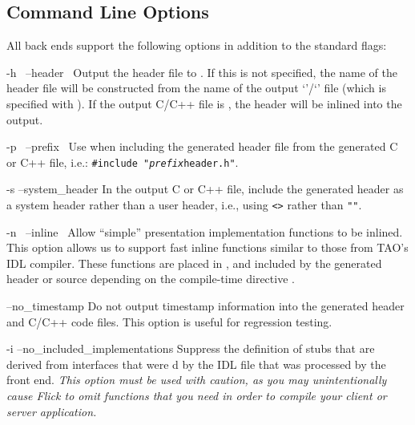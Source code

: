 \subsection{Command Line Options}
\label{subsec:BE:Command Line Options}

All back ends support the following options in addition to the standard flags:

\begin{optionlist}
  \item[-h~\optionarg{filename} \oroption{} --header~\optionarg{filename}]
  Output the header file to .  If this is not specified,
  the name of the header file will be constructed from the name of the output
  `'/`' file (which is specified with ).
  If the output C/C++ file is , the header will be inlined
  into the output.

  \item[-p~\optionarg{prefix} \oroption{} --prefix~\optionarg{prefix}]
  Use  when including the generated header file from the
  generated C or C++ file, i.e.: \texttt{\#include "\emph{prefix}header.h"}.

  \item[-s \oroption{} --system_header]
  In the output C or C++ file, include the generated header as a system header
  rather than a user header, i.e., using \texttt{<>} rather than \texttt{""}.

  \item[-n~\optionarg{filename} \oroption{} --inline~\optionarg{filename}]
  Allow ``simple'' presentation implementation functions to be inlined.  This
  option allows us to support fast inline functions similar to those from TAO's
  IDL compiler.  These functions are placed in , and
  included by the generated header or source depending on the compile-time
  directive .

  \item[--no_timestamp]
  Do not output timestamp information into the generated header and C/C++ code
  files.  This option is useful for regression testing.

  \item[-i \oroption{} --no_included_imple\-mentations]
  Suppress the definition of stubs that are derived from interfaces that were
  d by the IDL file that was processed by the front end.
  \emph{This option must be used with caution, as you may unintentionally
  cause Flick to omit functions that you need in order to compile your client
  or server application.}


\end{optionlist}
